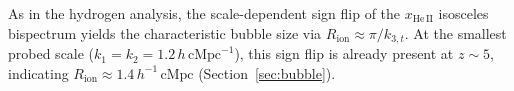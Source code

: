 \documentclass[apj,twocolumn, appendixfloats, twocolappendix, numberedappendix, tighten]{openjournal}
\begin{document}


As in the hydrogen analysis, the scale-dependent sign flip of the $x_\mathrm{He\,II}$ isosceles bispectrum yields the characteristic  bubble size via $R_\mathrm{ion} \approx \pi/k_{3,t}$. At the smallest probed scale ($k_1 = k_2 = 1.2\,h\,\mathrm{cMpc}^{-1}$), this sign flip is already present at $z \sim 5$, indicating $R_\mathrm{ion} \approx 1.4\,h^{-1}\,\mathrm{cMpc}$ (Section~\ref{sec:bubble}). %

\end{document}
